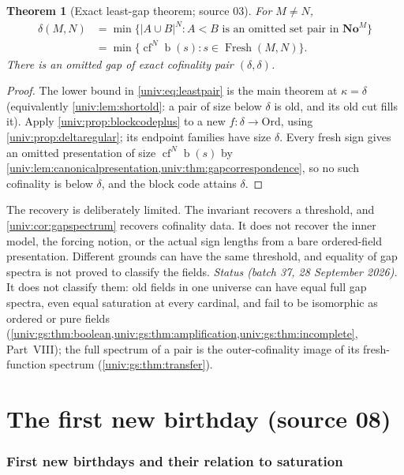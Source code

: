 \documentclass[11pt,letterpaper]{article}
\numberwithin{equation}{section}
\newtheorem{theorem}{Theorem}[section]
\theoremstyle{definition}
\theoremstyle{remark}
\newcommand{\No}{\mathbf{No}}
\newcommand{\NoM}{\No^{M}}
\newcommand{\Ord}{\mathrm{Ord}}
\newcommand{\bd}{\operatorname{b}}
\newcommand{\cf}{\operatorname{cf}}
\newcommand{\Fresh}{\operatorname{Fresh}}
\newcommand{\abs}[1]{\lvert#1\rvert}
\begin{document}
\begin{theorem}[Exact least-gap theorem; source 03]\label{univ:thm:leastgap}
For $M\ne N$,
\begin{align}
 \delta(M,N)
 &=\min\{\abs{A\cup B}^N:A<B\text{ is an omitted set pair in }\NoM\}
                                                        \label{univ:eq:leastpair}\\
 &=\min\{\cf^N\bd(s):s\in\Fresh(M,N)\}.                  \label{univ:eq:leastfresh}
\end{align}
There is an omitted gap of exact cofinality pair $(\delta,\delta)$.
\end{theorem}
\begin{proof}
The lower bound in \eqref{univ:eq:leastpair} is the main theorem at
$\kappa=\delta$ (equivalently \cref{univ:lem:shortold}: a pair of size below
$\delta$ is old, and its old cut fills it). Apply
\cref{univ:prop:blockcodeplus} to a new $f:\delta\to\Ord$, using
\cref{univ:prop:deltaregular}; its endpoint families have size $\delta$. Every
fresh sign gives an omitted presentation of size $\cf^N\bd(s)$ by
\cref{univ:lem:canonicalpresentation,univ:thm:gapcorrespondence}, so no such
cofinality is below $\delta$, and the block code attains $\delta$.
\end{proof}

The recovery is deliberately limited. The invariant recovers a threshold, and
\cref{univ:cor:gapspectrum} recovers cofinality data. It does not recover the
inner model, the forcing notion, or the actual sign lengths from a bare
ordered-field presentation. Different grounds can have the same threshold,
and equality of gap spectra is not proved to classify the fields.
\emph{Status (batch 37, 28 September 2026).} It does not classify them: old
fields in one universe can have equal full gap spectra, even equal saturation at
every cardinal, and fail to be isomorphic as ordered or pure fields
(\cref{univ:gs:thm:boolean,univ:gs:thm:amplification,univ:gs:thm:incomplete},
Part~VIII); the full spectrum of a pair is the outer-cofinality image of its
fresh-function spectrum (\cref{univ:gs:thm:transfer}).

\part{The first new birthday (source 08)}\label{univ:part:beta}

\section{First new birthdays and their relation to saturation}\label{univ:sec:beta}
\end{document}
